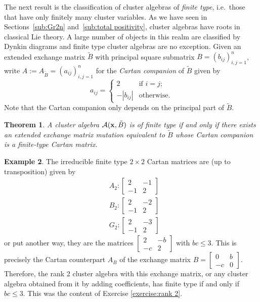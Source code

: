 \documentclass{amsart}
\newtheorem{theorem}{Theorem}[section]
\theoremstyle{definition}
\newtheorem{example}[theorem]{Example}
\theoremstyle{remark}
\numberwithin{equation}{section}
\newcommand{\cA}{{\mathcal{A}}}
\newcommand{\x}{{\bf x}}
\begin{document}
	The next result is the classification of cluster algebras of \emph{finite type}, i.e.\ those that have only finitely many cluster variables.  As we have seen in Sections~\ref{sub:Gr2n} and~\ref{sub:total positivity}, cluster algebras have roots in classical Lie theory.  A large number of objects in this realm are classified by Dynkin diagrams and finite type cluster algebras are no exception.  Given an extended exchange matrix $\tilde B$ with principal square submatrix $B=(b_{ij})_{i,j=1}^n$, write $A:=A_{\tilde B}=(a_{ij})_{i,j=1}^n$ for the \emph{Cartan companion} of $\tilde B$ given by 
  \[a_{ij}=\begin{cases}2 & \text{if $i=j$;}\\ -|b_{ij}| & \text{otherwise.}\end{cases}\]
  Note that the Cartan companion only depends on the principal part of $\tilde B$.
  \begin{theorem}\cite{FZ03}
    A cluster algebra $\cA(\x,\tilde B)$ is of finite type if and only if there exists an extended exchange matrix mutation equivalent to $\tilde B$ whose Cartan companion is a finite-type Cartan matrix.
  \end{theorem}
  \begin{example}
		The irreducible finite type $2 \times 2$ Cartan matrices are (up to transposition) given by
		\begin{align*}
		&A_2 : \left[\begin{array}{cc} 2 & -1\\ -1 & 2\end{array}\right] \\
		&B_2 : \left[\begin{array}{cc} 2 & -2\\ -1 & 2\end{array}\right] \\
		&G_2 : \left[\begin{array}{cc} 2 & -3\\ -1 & 2\end{array}\right]
		\end{align*}
		or put another way, they are the matrices $\left[\begin{array}{cc} 2 & -b\\ -c & 2\end{array}\right]$ with $bc \leq 3$.  This is precisely the Cartan counterpart $A_B$ of the exchange matrix $B=\left[\begin{array}{cc} 0 & b\\ -c & 0\end{array}\right]$.  Therefore, the rank 2 cluster algebra with this exchange matrix, or any cluster algebra obtained from it by adding coefficients, has finite type if and only if $bc \leq 3$.  This was the content of Exercise \ref{exercise:rank 2}.
		\end{example}
		
\end{document}
